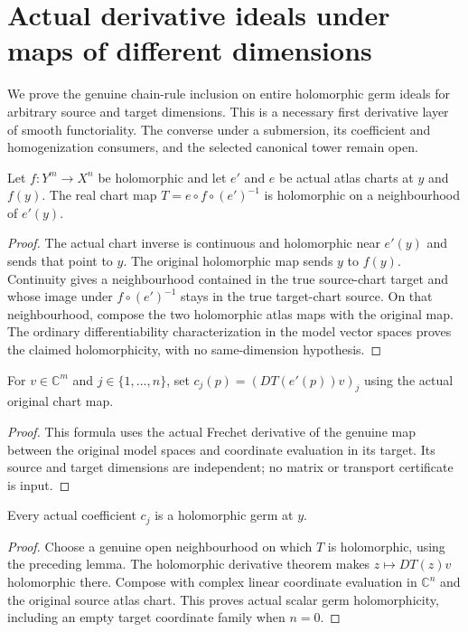 \section{Actual derivative ideals under maps of different dimensions}

We prove the genuine chain-rule inclusion on entire holomorphic germ ideals for
arbitrary source and target dimensions. This is a necessary first derivative
layer of smooth functoriality. The converse under a submersion, its coefficient
and homogenization consumers, and the selected canonical tower remain open.

\begin{lemma}\label{hir:crossdim-chart-map}
Let $f:Y^m\to X^n$ be holomorphic and let $e'$ and $e$ be actual atlas charts
at $y$ and $f(y)$. The real chart map $T=e\circ f\circ(e')^{-1}$ is holomorphic
on a neighbourhood of $e'(y)$.
\leanok
\end{lemma}
\begin{proof}
The actual chart inverse is continuous and holomorphic near $e'(y)$ and sends
that point to $y$. The original holomorphic map sends $y$ to $f(y)$.
Continuity gives a neighbourhood contained in the true source-chart target
and whose image under $f\circ(e')^{-1}$ stays in the true target-chart source.
On that neighbourhood, compose the two holomorphic atlas maps with the original
map. The ordinary differentiability characterization in the model vector
spaces proves the claimed holomorphicity, with no same-dimension hypothesis.
\end{proof}

\begin{definition}\label{hir:crossdim-chain-coeff}
For $v\in\mathbb C^m$ and $j\in\{1,\ldots,n\}$, set
$c_j(p)=(DT(e'(p))v)_j$ using the actual original chart map.
\leanok
{}
\end{definition}
\begin{proof}
This formula uses the actual Frechet derivative of the genuine map between
the original model spaces and coordinate evaluation in its target. Its source
and target dimensions are independent; no matrix or transport certificate is input.
\end{proof}

\begin{lemma}\label{hir:crossdim-chain-holomorphic}
Every actual coefficient $c_j$ is a holomorphic germ at $y$.
\leanok
{}
\end{lemma}
\begin{proof}
Choose a genuine open neighbourhood on which $T$ is holomorphic, using the
preceding lemma. The holomorphic derivative theorem makes $z\mapsto DT(z)v$
holomorphic there. Compose with complex linear coordinate evaluation in
$\mathbb C^n$ and the original source atlas chart. This proves actual scalar
germ holomorphicity, including an empty target coordinate family when $n=0$.
\end{proof}

